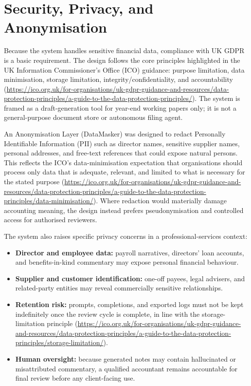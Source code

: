 \section{Security, Privacy, and Anonymisation}
Because the system handles sensitive financial data, compliance with UK GDPR is a basic requirement. The design follows the core principles highlighted in the UK Information Commissioner's Office (ICO) guidance: purpose limitation, data minimisation, storage limitation, integrity/confidentiality, and accountability (\url{https://ico.org.uk/for-organisations/uk-gdpr-guidance-and-resources/data-protection-principles/a-guide-to-the-data-protection-principles/}). The system is framed as a draft-generation tool for year-end working papers only; it is not a general-purpose document store or autonomous filing agent.

An Anonymisation Layer (DataMasker) was designed to redact Personally Identifiable Information (PII) such as director names, sensitive supplier names, personal addresses, and free-text references that could expose natural persons. This reflects the ICO's data-minimisation expectation that organisations should process only data that is adequate, relevant, and limited to what is necessary for the stated purpose (\url{https://ico.org.uk/for-organisations/uk-gdpr-guidance-and-resources/data-protection-principles/a-guide-to-the-data-protection-principles/data-minimisation/}). Where redaction would materially damage accounting meaning, the design instead prefers pseudonymisation and controlled access for authorised reviewers.

The system also raises specific privacy concerns in a professional-services context:
\begin{itemize}
    \item \textbf{Director and employee data:} payroll narratives, directors' loan accounts, and benefits-in-kind commentary may expose personal financial behaviour.
    \item \textbf{Supplier and customer identification:} one-off payees, legal advisers, and related-party entities may reveal commercially sensitive relationships.
    \item \textbf{Retention risk:} prompts, completions, and exported logs must not be kept indefinitely once the review cycle is complete, in line with the storage-limitation principle (\url{https://ico.org.uk/for-organisations/uk-gdpr-guidance-and-resources/data-protection-principles/a-guide-to-the-data-protection-principles/storage-limitation/}).
    \item \textbf{Human oversight:} because generated notes may contain hallucinated or misattributed commentary, a qualified accountant remains accountable for final review before any client-facing use.
\end{itemize}

